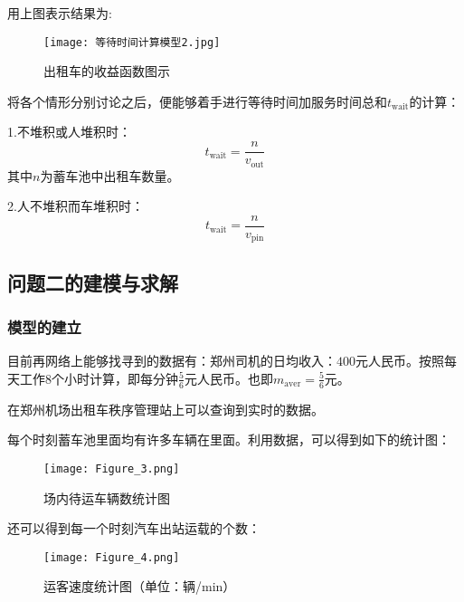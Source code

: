 \documentclass[withoutpreface,bwprint]{cumcmthesis} %
\begin{document}
用上图表示结果为:
\begin{figure}[!h]
	\centering
	\texttt{[image: 等待时间计算模型2.jpg]}
	\caption{出租车的收益函数图示}
\end{figure}
\newpage
将各个情形分别讨论之后，便能够着手进行等待时间加服务时间总和$t_{\mathrm{wait}}$的计算：

1.不堆积或人堆积时：
\begin{equation}
	t_{\mathrm{wait}}=\frac{n}{v_{\mathrm{out}}}
\end{equation}
其中$n$为蓄车池中出租车数量。

2.人不堆积而车堆积时：
\begin{equation}
	t_{\mathrm{wait}}=\frac{n}{v_{\mathrm{pin}}}
\end{equation}

\newpage
\subsection{问题二的建模与求解}

\subsubsection{模型的建立}
目前再网络上能够找寻到的数据有：郑州司机的日均收入：$400$元人民币。按照每天工作$8$个小时计算，即每分钟$\frac{5}{6}$元人民币。也即$m_{\mathrm{aver} }= \frac{5}{6}$元。\par
在郑州机场出租车秩序管理站上可以查询到实时的数据。\par
每个时刻蓄车池里面均有许多车辆在里面。利用数据，可以得到如下的统计图：\par
\begin{figure}[!h]
	\centering
	\texttt{[image: Figure\_3.png]}
	\caption{场内待运车辆数统计图}
\end{figure}
还可以得到每一个时刻汽车出站运载的个数：\par
\begin{figure}[!h]
	\centering
	\texttt{[image: Figure\_4.png]}
	\caption{运客速度统计图（单位：辆/min）}
\end{figure}
\end{document}
